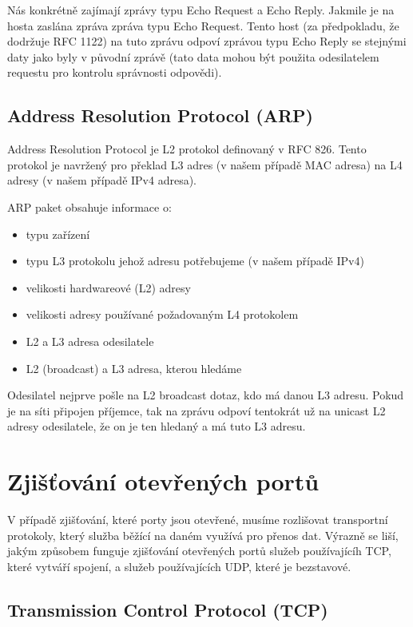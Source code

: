 \documentclass[../projekt.tex]{subfiles}
\begin{document}
Nás konkrétně zajímají zprávy typu Echo Request a Echo Reply. Jakmile je na hosta zaslána zpráva zpráva typu Echo Request. Tento host (za předpokladu, že dodržuje RFC 1122\cite{RFC1122}) na tuto zprávu odpoví zprávou typu Echo Reply se stejnými daty jako byly v původní zprávě (tato data mohou být použita odesilatelem requestu pro kontrolu správnosti odpovědi).

\subsection{Address Resolution Protocol (ARP)}
Address Resolution Protocol je L2 protokol definovaný v RFC 826\cite{RFC0826}. Tento protokol je navržený pro překlad L3 adres (v našem případě MAC adresa) na L4 adresy (v našem případě IPv4 adresa).

ARP paket obsahuje informace o:
\begin{itemize}
    \item typu zařízení
    \item typu L3 protokolu jehož adresu potřebujeme (v našem případě IPv4)
    \item velikosti hardwareové (L2) adresy
    \item velikosti adresy používané požadovaným L4 protokolem
    \item L2 a L3 adresa odesilatele
    \item L2 (broadcast) a L3 adresa, kterou hledáme
\end{itemize}

Odesilatel nejprve pošle na L2 broadcast dotaz, kdo má danou L3 adresu. Pokud je na síti připojen příjemce, tak na zprávu odpoví tentokrát už na unicast L2 adresy odesilatele, že on je ten hledaný a má tuto L3 adresu.

\section{Zjišťování otevřených portů}

V případě zjišťování, které porty jsou otevřené, musíme rozlišovat transportní protokoly, který služba běžící na daném využívá pro přenos dat. Výrazně se liší, jakým způsobem funguje zjišťování otevřených portů služeb používajícíh TCP, které vytváří spojení, a služeb používajících UDP, které je bezstavové.

\subsection{Transmission Control Protocol (TCP)}
\end{document}

